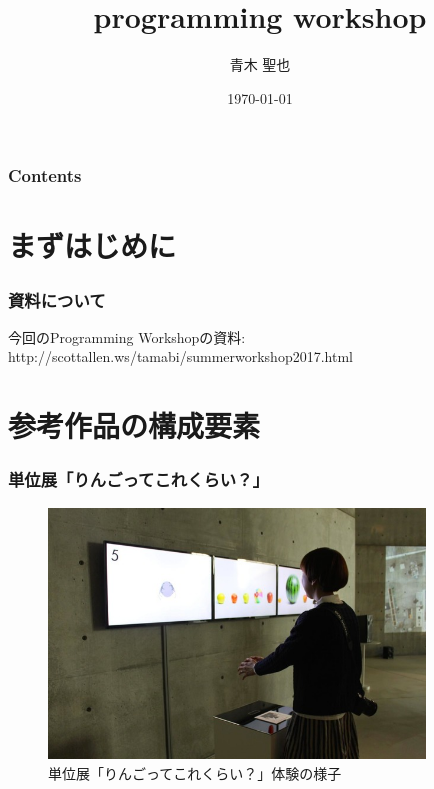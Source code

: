\documentclass[10pt, dvipdfmx]{beamer}
\title{programming workshop}
\author{青木 聖也}
\institute[所属]{多摩美術大学情報デザイン研究室}
\date{\today}
\begin{document}
    \begin{frame}[plain]
        \frametitle{}
	    \titlepage
    \end{frame}

    \begin{frame}
        \frametitle{Contents}
        \tableofcontents
    \end{frame}

    \section{まずはじめに}
        \begin{frame}
            \frametitle{資料について}
            今回のProgramming Workshopの資料:\\
            http://scottallen.ws/tamabi/summerworkshop2017.html\\
        \end{frame}

        \begin{frame}
        \end{frame}

    \section{参考作品の構成要素}
        \begin{frame}
            \frametitle{単位展「りんごってこれくらい？」}
                \begin{figure}[htb]
                    \includegraphics[width=100mm]{images/tanniten.jpg}
                    \caption{単位展「りんごってこれくらい？」体験の様子}
                    \label{fig:01}
                \end{figure}
        \end{frame}
\end{document}
